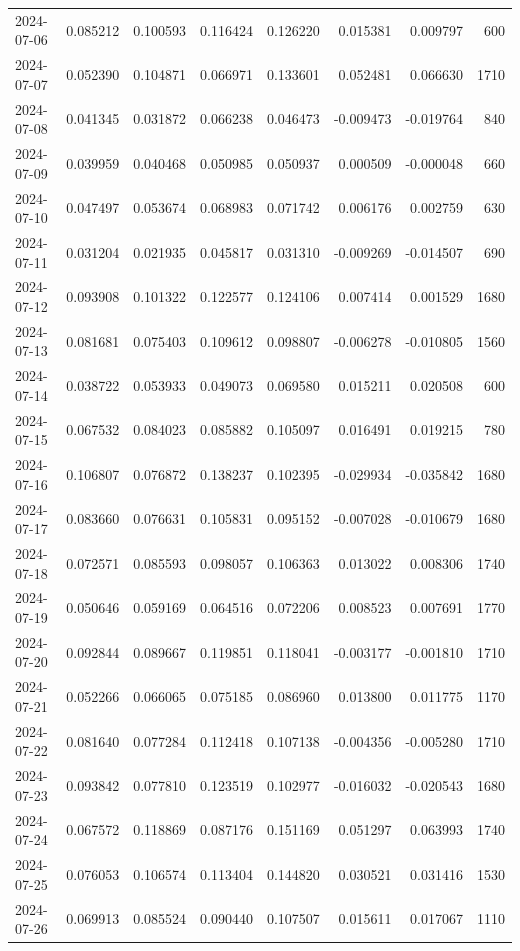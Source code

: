 \begin{tabular}{lrrrrrrr}
2024-07-06 & 0.085212 & 0.100593 & 0.116424 & 0.126220 & 0.015381 & 0.009797 & 600 \\
2024-07-07 & 0.052390 & 0.104871 & 0.066971 & 0.133601 & 0.052481 & 0.066630 & 1710 \\
2024-07-08 & 0.041345 & 0.031872 & 0.066238 & 0.046473 & -0.009473 & -0.019764 & 840 \\
2024-07-09 & 0.039959 & 0.040468 & 0.050985 & 0.050937 & 0.000509 & -0.000048 & 660 \\
2024-07-10 & 0.047497 & 0.053674 & 0.068983 & 0.071742 & 0.006176 & 0.002759 & 630 \\
2024-07-11 & 0.031204 & 0.021935 & 0.045817 & 0.031310 & -0.009269 & -0.014507 & 690 \\
2024-07-12 & 0.093908 & 0.101322 & 0.122577 & 0.124106 & 0.007414 & 0.001529 & 1680 \\
2024-07-13 & 0.081681 & 0.075403 & 0.109612 & 0.098807 & -0.006278 & -0.010805 & 1560 \\
2024-07-14 & 0.038722 & 0.053933 & 0.049073 & 0.069580 & 0.015211 & 0.020508 & 600 \\
2024-07-15 & 0.067532 & 0.084023 & 0.085882 & 0.105097 & 0.016491 & 0.019215 & 780 \\
2024-07-16 & 0.106807 & 0.076872 & 0.138237 & 0.102395 & -0.029934 & -0.035842 & 1680 \\
2024-07-17 & 0.083660 & 0.076631 & 0.105831 & 0.095152 & -0.007028 & -0.010679 & 1680 \\
2024-07-18 & 0.072571 & 0.085593 & 0.098057 & 0.106363 & 0.013022 & 0.008306 & 1740 \\
2024-07-19 & 0.050646 & 0.059169 & 0.064516 & 0.072206 & 0.008523 & 0.007691 & 1770 \\
2024-07-20 & 0.092844 & 0.089667 & 0.119851 & 0.118041 & -0.003177 & -0.001810 & 1710 \\
2024-07-21 & 0.052266 & 0.066065 & 0.075185 & 0.086960 & 0.013800 & 0.011775 & 1170 \\
2024-07-22 & 0.081640 & 0.077284 & 0.112418 & 0.107138 & -0.004356 & -0.005280 & 1710 \\
2024-07-23 & 0.093842 & 0.077810 & 0.123519 & 0.102977 & -0.016032 & -0.020543 & 1680 \\
2024-07-24 & 0.067572 & 0.118869 & 0.087176 & 0.151169 & 0.051297 & 0.063993 & 1740 \\
2024-07-25 & 0.076053 & 0.106574 & 0.113404 & 0.144820 & 0.030521 & 0.031416 & 1530 \\
2024-07-26 & 0.069913 & 0.085524 & 0.090440 & 0.107507 & 0.015611 & 0.017067 & 1110 \\

\end{tabular}
